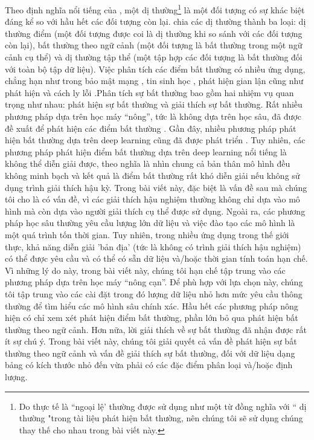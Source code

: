 Theo định nghĩa nổi tiếng của \cite{hawkins1980identification}, một dị thường\footnote{Do thực tế là ``ngoại lệ' thường được sử dụng như một từ đồng nghĩa với `` dị thường "trong tài liệu phát hiện bất thường, nên chúng tôi sẽ sử dụng chúng thay thế cho nhau trong bài viết này.} là một đối tượng có sự khác biệt đáng kể so với hầu hết các đối tượng còn lại. \cite{chandola2009anomaly} chia các dị thường thành ba loại: dị thường điểm (một đối tượng được coi là dị thường khi so sánh với các đối tượng còn lại), bất thường theo ngữ cảnh (một đối tượng là bất thường trong một ngữ cảnh cụ thể) và dị thường tập thể (một tập hợp các đối tượng là bất thường đối với toàn bộ tập dữ liệu). Việc phân tích các điểm bất thường có nhiều ứng dụng, chẳng hạn như trong bảo mật mạng \citep{ahmed2016survey1}, tin sinh học \citep{spinosa2005support}, phát hiện gian lận \citep{ahmed2016survey2} cũng như phát hiện và cách ly lỗi \citep{hwang2009survey}.Phân tích sự bất thường bao gồm hai nhiệm vụ quan trọng như nhau: phát hiện sự bất thường và giải thích sự bất thường. Rất nhiều phương pháp dựa trên học máy “nông”, tức là không dựa trên học sâu, đã được đề xuất để phát hiện các điểm bất thường \citep{chandola2009anomaly}. Gần đây, nhiều phương pháp phát hiện bất thường dựa trên deep learning cũng đã được phát triển \citep{pang2021deep}.
Tuy nhiên, các phương pháp phát hiện điểm bất thường dựa trên deep learning nổi tiếng là không thể diễn giải được, theo nghĩa là nhìn chung cả bản thân mô hình đều không minh bạch và kết quả là điểm bất thường rất khó diễn giải nếu không sử dụng trình giải thích hậu kỳ. Trong bài viết này, đặc biệt là vấn đề sau mà chúng tôi cho là có vấn đề, vì các giải thích hậu nghiệm thường không chỉ dựa vào mô hình mà còn dựa vào người giải thích cụ thể được sử dụng. Ngoài ra, các phương pháp học sâu thường yêu cầu lượng lớn dữ liệu và việc đào tạo các mô hình là một quá trình tốn thời gian. Tuy nhiên, trong nhiều ứng dụng trong thế giới thực, khả năng diễn giải 'bản địa' (tức là không có trình giải thích hậu nghiệm) có thể được yêu cầu và có thể có sẵn dữ liệu và/hoặc thời gian tính toán hạn chế. Vì những lý do này, trong bài viết này, chúng tôi hạn chế tập trung vào các phương pháp dựa trên học máy “nông cạn”. Để phù hợp với lựa chọn này, chúng tôi tập trung vào các cài đặt trong đó lượng dữ liệu nhỏ hơn mức yêu cầu thông thường để tìm hiểu các mô hình sâu chính xác. Hầu hết các phương pháp nông hiện có chỉ xem xét phát hiện điểm bất thường, phần lớn bỏ qua phát hiện bất thường theo ngữ cảnh. Hơn nữa, lời giải thích về sự bất thường đã nhận được rất ít sự chú ý. Trong bài viết này, chúng tôi giải quyết cả vấn đề phát hiện sự bất thường theo ngữ cảnh và vấn đề giải thích sự bất thường, đối với dữ liệu dạng bảng có kích thước nhỏ đến vừa phải có các đặc điểm phân loại và/hoặc định lượng.

